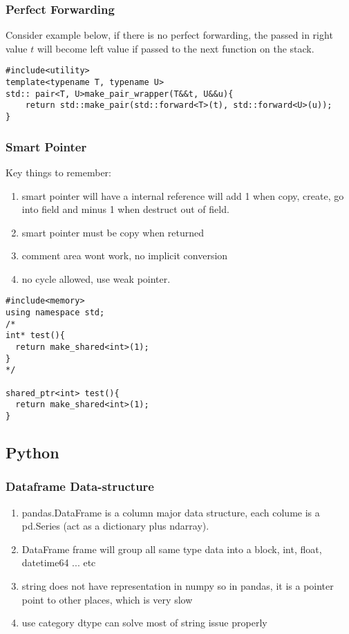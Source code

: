 \subsubsection{Perfect Forwarding}

Consider example below, if there is no perfect forwarding, the passed in right value $t$ will become left value if passed to the next function on the stack. 
\begin{lstlisting}
#include<utility>
template<typename T, typename U>
std:: pair<T, U>make_pair_wrapper(T&&t, U&&u){
	return std::make_pair(std::forward<T>(t), std::forward<U>(u));	
}
\end{lstlisting}
\subsubsection{Smart Pointer}
Key things to remember:
\begin{enumerate}
\item smart pointer will have a internal reference will add 1 when copy, create, go into field and minus 1 when destruct out of field.
\item smart pointer must be copy when returned
\item comment area wont work, no implicit conversion
\item no cycle allowed, use weak pointer.
\end{enumerate}

\begin{lstlisting}
#include<memory>
using namespace std;
/*                                                                              
int* test(){                                                                    
  return make_shared<int>(1);                                                   
}                                                                               
*/

shared_ptr<int> test(){
  return make_shared<int>(1);
}
\end{lstlisting}
\subsection{Python}
\subsubsection{Dataframe Data-structure}
\begin{enumerate}
\item pandas.DataFrame is a column major data structure, each colume is a pd.Series (act as a dictionary plus ndarray).
\item DataFrame frame will group all same type data into a block, int, float, datetime64 ... etc
\item string does not have representation in numpy so in pandas, it is a pointer point to other places, which is very slow
\item use {\color{red}category} dtype can solve most of string issue properly
\end{enumerate}

